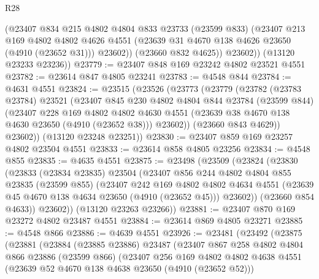 \begin{lexlean}{R28}
\begin{coremodule}
            (@23407
              @834
              @215
              @4802
              @4804
              @833
              @23733
              (@23599 @833)
              (@23407
                @213
                @169
                @4802
                @4802
                @4626
                @4551
                (@23639 @31 @4670 @138 @4626 @23650 (@4910 (@23652 @31)))
                @23602))
            (@23660 @832 @4625))
          @23602))
      (@13120 @23233 @23236))
@23779 := @23407 @848 @169 @23242 @4802 @23521 @4551
@23782 := @23614 @847 @4805 @23241
@23783 := @4548 @844
@23784 := @4631 @4551
@23824 := @23515
    (@23526
      (@23773
        (@23779
          (@23782
            (@23783 @23784)
            @23521
            (@23407
              @845
              @230
              @4802
              @4804
              @844
              @23784
              (@23599 @844)
              (@23407
                @228
                @169
                @4802
                @4802
                @4630
                @4551
                (@23639 @38 @4670 @138 @4630 @23650 (@4910 (@23652 @38)))
                @23602))
            (@23660 @843 @4629))
          @23602))
      (@13120 @23248 @23251))
@23830 := @23407 @859 @169 @23257 @4802 @23504 @4551
@23833 := @23614 @858 @4805 @23256
@23834 := @4548 @855
@23835 := @4635 @4551
@23875 := @23498
    (@23509
      (@23824
        (@23830
          (@23833
            (@23834 @23835)
            @23504
            (@23407
              @856
              @244
              @4802
              @4804
              @855
              @23835
              (@23599 @855)
              (@23407
                @242
                @169
                @4802
                @4802
                @4634
                @4551
                (@23639 @45 @4670 @138 @4634 @23650 (@4910 (@23652 @45)))
                @23602))
            (@23660 @854 @4633))
          @23602))
      (@13120 @23263 @23266))
@23881 := @23407 @870 @169 @23272 @4802 @23487 @4551
@23884 := @23614 @869 @4805 @23271
@23885 := @4548 @866
@23886 := @4639 @4551
@23926 := @23481
    (@23492
      (@23875
        (@23881
          (@23884
            (@23885 @23886)
            @23487
            (@23407
              @867
              @258
              @4802
              @4804
              @866
              @23886
              (@23599 @866)
              (@23407
                @256
                @169
                @4802
                @4802
                @4638
                @4551
                (@23639 @52 @4670 @138 @4638 @23650 (@4910 (@23652 @52)))

\end{coremodule}
\end{lexlean}
